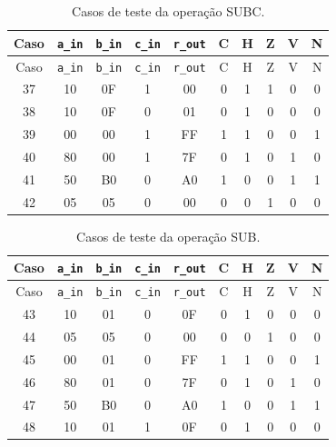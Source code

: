 \begin{longtable}{c c c c c c c c c c}
\caption{Casos de teste da operação SUBC.}
\label{tab:testes-SUBC}\\
\hline
Caso & \texttt{a\_in} & \texttt{b\_in} & \texttt{c\_in} & \texttt{r\_out} & C & H & Z & V & N \\ \hline
\endfirsthead
\hline
Caso & \texttt{a\_in} & \texttt{b\_in} & \texttt{c\_in} & \texttt{r\_out} & C & H & Z & V & N \\ \hline
\endhead
37 & 10 & 0F & 1 & 00 & 0 & 1 & 1 & 0 & 0 \\
38 & 10 & 0F & 0 & 01 & 0 & 1 & 0 & 0 & 0 \\
39 & 00 & 00 & 1 & FF & 1 & 1 & 0 & 0 & 1 \\
40 & 80 & 00 & 1 & 7F & 0 & 1 & 0 & 1 & 0 \\
41 & 50 & B0 & 0 & A0 & 1 & 0 & 0 & 1 & 1 \\
42 & 05 & 05 & 0 & 00 & 0 & 0 & 1 & 0 & 0 \\
\hline
\end{longtable}
\vspace{-0.5cm}

\begin{longtable}{c c c c c c c c c c}
\caption{Casos de teste da operação SUB.}
\label{tab:testes-SUB}\\
\hline
Caso & \texttt{a\_in} & \texttt{b\_in} & \texttt{c\_in} & \texttt{r\_out} & C & H & Z & V & N \\ \hline
\endfirsthead
\hline
Caso & \texttt{a\_in} & \texttt{b\_in} & \texttt{c\_in} & \texttt{r\_out} & C & H & Z & V & N \\ \hline
\endhead
43 & 10 & 01 & 0 & 0F & 0 & 1 & 0 & 0 & 0 \\
44 & 05 & 05 & 0 & 00 & 0 & 0 & 1 & 0 & 0 \\
45 & 00 & 01 & 0 & FF & 1 & 1 & 0 & 0 & 1 \\
46 & 80 & 01 & 0 & 7F & 0 & 1 & 0 & 1 & 0 \\
47 & 50 & B0 & 0 & A0 & 1 & 0 & 0 & 1 & 1 \\
48 & 10 & 01 & 1 & 0F & 0 & 1 & 0 & 0 & 0 \\
\hline
\end{longtable}
\vspace{-0.5cm}

